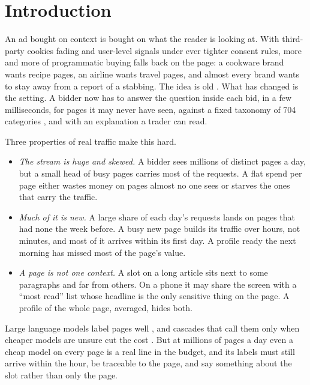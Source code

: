 \section{Introduction}\label{sec:intro}

An ad bought on context is bought on what the reader is looking at. With third-party cookies fading and user-level signals under ever tighter consent rules, more and more of programmatic buying falls back on the page: a cookware brand wants recipe pages, an airline wants travel pages, and almost every brand wants to stay away from a report of a stabbing. The idea is old \citep{ribeironeto2005impedance,broder2007semantic}. What has changed is the setting. A bidder now has to answer the question inside each bid, in a few milliseconds, for pages it may never have seen, against a fixed taxonomy of 704 categories \citep{iabtechlab2024content}, and with an explanation a trader can read.

Three properties of real traffic make this hard.
\begin{itemize}
\item \emph{The stream is huge and skewed.} A bidder sees millions of distinct pages a day, but a small head of busy pages carries most of the requests. A flat spend per page either wastes money on pages almost no one sees or starves the ones that carry the traffic.
\item \emph{Much of it is new.} A large share of each day's requests lands on pages that had none the week before. A busy new page builds its traffic over hours, not minutes, and most of it arrives within its first day. A profile ready the next morning has missed most of the page's value.
\item \emph{A page is not one context.} A slot on a long article sits next to some paragraphs and far from others. On a phone it may share the screen with a ``most read'' list whose headline is the only sensitive thing on the page. A profile of the whole page, averaged, hides both.
\end{itemize}

Large language models label pages well \citep{gilardi2023chatgpt}, and cascades that call them only when cheaper models are unsure cut the cost \citep{chen2024frugalgpt}. But at millions of pages a day even a cheap model on every page is a real line in the budget, and its labels must still arrive within the hour, be traceable to the page, and say something about the slot rather than only the page.

